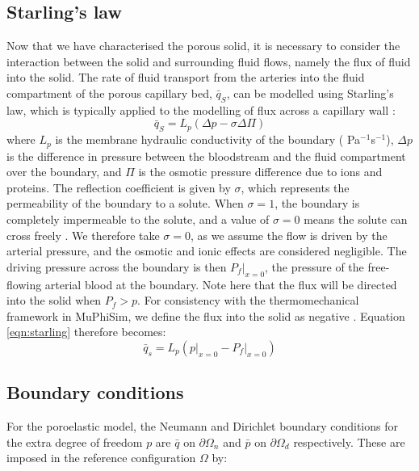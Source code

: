\documentclass[oneside,11pt,times]{book}
\begin{document}
\subsection{Starling's law} \label{starling}
Now that we have characterised the porous solid, it is necessary to consider the interaction between the solid and surrounding fluid flows, namely the flux of fluid into the solid. The rate of fluid transport from the arteries into the fluid compartment of the porous capillary bed, $\bar{q}_S$, can be modelled using Starling's law, which is typically applied to the modelling of flux across a capillary wall \cite{goriely2016mathematical}:
\begin{equation}
\label{eqn:starling}
    \bar{q}_S = L_p \left( \Delta p - \sigma \Delta \Pi \right)
\end{equation}
where $L_p$ is the membrane hydraulic conductivity of the boundary ( Pa$^{-1}$s$^{-1}$), $\Delta p$ is the difference in pressure between the bloodstream and the fluid compartment over the boundary, and $\Pi$ is the osmotic pressure difference due to ions and proteins. The reflection coefficient is given by $\sigma$, which  represents the permeability of the boundary to a solute. When $\sigma = 1$, the boundary is completely impermeable to the solute, and a value of $\sigma = 0$ means the solute can cross freely \cite{goriely2016mathematical}. We therefore take $\sigma = 0$, as we assume the flow is driven by the arterial pressure, and the osmotic and ionic effects are considered negligible.
The driving pressure across the boundary is then $P_f\vert_{x=0}$, the pressure of the free-flowing arterial blood at the boundary. Note here that the flux will be directed into the solid when $P_f>p$. For consistency with the thermomechanical framework in MuPhiSim, we define the flux into the solid as negative \cite{muphisim}.  Equation \eqref{eqn:starling} therefore becomes:
\begin{equation}
\label{eqn:starling_new}
    \bar{q}_s = L_p \left( p\vert_{x=0} - P_f\vert_{x=0} \right)
\end{equation}

\subsection{Boundary conditions}
For the poroelastic model, the Neumann and Dirichlet boundary conditions for the extra degree of freedom $p$ are $\bar{q}$ on $\partial \Omega_n$ and $\bar{p}$ on $\partial \Omega_d$ respectively. These are imposed in the reference configuration $\Omega$ by:
\end{document}
